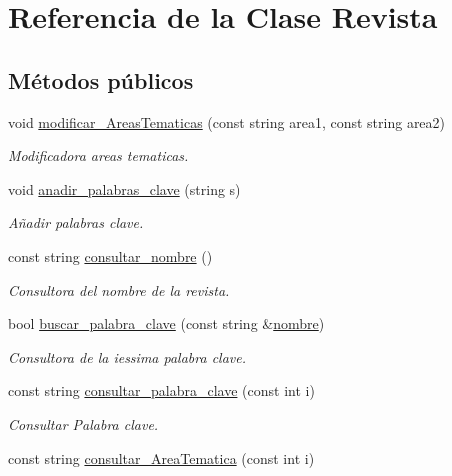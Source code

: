 \hypertarget{class_revista}{\section{Referencia de la Clase Revista}
\label{class_revista}
}
\subsection*{Métodos públicos}
\begin{DoxyCompactItemize}
\item 
void \hyperlink{class_revista_aff45d18000f503ccaaba3fe8f956661c}{modificar\-\_\-\-Areas\-Tematicas} (const string area1, const string area2)
\begin{DoxyCompactList}\small\item\em Modificadora areas tematicas. \end{DoxyCompactList}\item 
void \hyperlink{class_revista_a66196e55b9c7bc258503ff156bde1017}{anadir\-\_\-palabras\-\_\-clave} (string s)
\begin{DoxyCompactList}\small\item\em Añadir palabras clave. \end{DoxyCompactList}\item 
const string \hyperlink{class_revista_ac4280da6c0b0ba71f544ce0dae897090}{consultar\-\_\-nombre} ()
\begin{DoxyCompactList}\small\item\em Consultora del nombre de la revista. \end{DoxyCompactList}\item 
bool \hyperlink{class_revista_a5a6f6d3a8f5ef4f233d794a705b686c6}{buscar\-\_\-palabra\-\_\-clave} (const string \&\hyperlink{class_revista_a8f33fc429436702dc5bdd6abff4ec9ac}{nombre})
\begin{DoxyCompactList}\small\item\em Consultora de la iessima palabra clave. \end{DoxyCompactList}\item 
const string \hyperlink{class_revista_a3e2906ef22fd65c8e57cbbde97b341ab}{consultar\-\_\-palabra\-\_\-clave} (const int i)
\begin{DoxyCompactList}\small\item\em Consultar Palabra clave. \end{DoxyCompactList}\item 
const string \hyperlink{class_revista_ac3f02e06468f395bafdf7065469d46de}{consultar\-\_\-\-Area\-Tematica} (const int i)

\end{DoxyCompactItemize}
